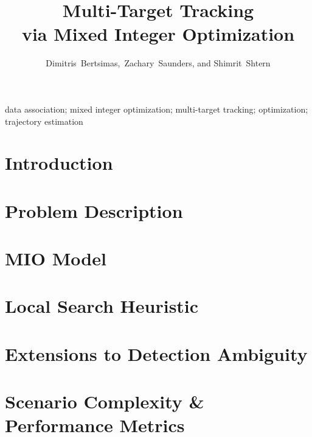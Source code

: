 \documentclass[journal]{IEEEtran}
\begin{document}
\title{Multi-Target Tracking\\ via Mixed Integer Optimization}


\author{Dimitris~Bertsimas,~Zachary~Saunders, and Shimrit~Shtern}

\maketitle

\begin{abstract}

\end{abstract}

\begin{IEEEkeywords}
data association; mixed integer optimization; multi-target tracking; optimization; trajectory estimation
\end{IEEEkeywords}

\section{Introduction}\label{sec: Intro}


\section{Problem Description}\label{sec:Problem Description}


\section{MIO Model}\label{sec:Basic MIO Model}


\section{Local Search Heuristic} \label{sec:Heuristic}


\section{Extensions to Detection Ambiguity}\label{sec:Robust MIO Model}


\section{Scenario Complexity \& Performance Metrics} \label{sec:Scenario-Performance}

 
\end{document}
